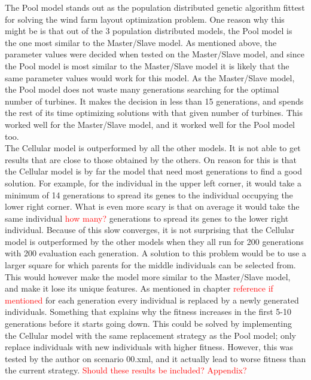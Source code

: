 
\noindent The Pool model stands out as the population distributed genetic algorithm fittest for solving the wind farm layout optimization problem. One reason why this might be is that out of the 3 population distributed models, the Pool model is the one most similar to the Master/Slave model. As mentioned above, the parameter values were decided when tested on the Master/Slave model, and since the Pool model is most similar to the Master/Slave model it is likely that the same parameter values would work for this model. As the Master/Slave model, the Pool model does not waste many generations searching for the optimal number of turbines. It makes the decision in less than 15 generations, and spends the rest of its time optimizing solutions with that given number of turbines. This worked well for the Master/Slave model, and it worked well for the Pool model too. \\

\noindent The Cellular model is outperformed by all the other models. It is not able to get results that are close to those obtained by the others. On reason for this is that the Cellular model is by far the model that need most generations to find a good solution. For example, for the individual in the upper left corner, it would take a minimum of 14 generations to spread its genes to the individual occupying the lower right corner. What is even more scary is that on average it would take the same individual \textcolor{red}{how many?} generations to spread its genes to the lower right individual. Because of this slow converges, it is not surprising that the Cellular model is outperformed by the other models when they all run for 200 generations with 200 evaluation each generation. A solution to this problem would be to use a larger square for which parents for the middle individuals can be selected from. This would however make the model more similar to the Master/Slave model, and make it lose its unique features. As mentioned in chapter \textcolor{red}{reference if mentioned} for each generation every individual is replaced by a newly generated individuals. Something that explains why the fitness increases in the first 5-10 generations before it starts going down. This could be solved by implementing the Cellular model with the same replacement strategy as the Pool model; only replace individuals with new individuals with higher fitness. However, this was tested by the author on scenario 00.xml, and it actually lead to worse fitness than the current strategy. \textcolor{red}{Should these results be included? Appendix?}\\


